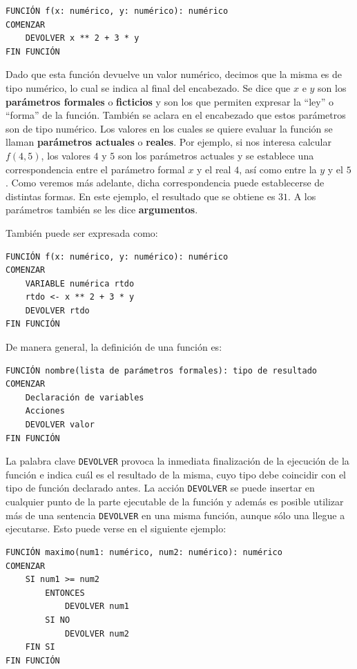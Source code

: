 \documentclass[]{book}
\begin{document}
\begin{verbatim}
FUNCIÓN f(x: numérico, y: numérico): numérico
COMENZAR
    DEVOLVER x ** 2 + 3 * y
FIN FUNCIÓN
\end{verbatim}

Dado que esta función devuelve un valor numérico, decimos que la misma es de tipo numérico, lo cual se indica al final del encabezado. Se dice que \(x\) e \(y\) son los \textbf{parámetros formales} o \textbf{ficticios} y son los que permiten expresar la ``ley'' o ``forma'' de la función. También se aclara en el encabezado que estos parámetros son de tipo numérico. Los valores en los cuales se quiere evaluar la función se llaman \textbf{parámetros actuales} o \textbf{reales}. Por ejemplo, si nos interesa calcular \(f(4, 5)\), los valores \(4\) y \(5\) son los parámetros actuales y se establece una correspondencia entre el parámetro formal \(x\) y el real \(4\), así como entre la \(y\) y el \(5\). Como veremos más adelante, dicha correspondencia puede establecerse de distintas formas. En este ejemplo, el resultado que se obtiene es \(31\). A los parámetros también se les dice \textbf{argumentos}.

También puede ser expresada como:

\begin{verbatim}
FUNCIÓN f(x: numérico, y: numérico): numérico
COMENZAR
    VARIABLE numérica rtdo
    rtdo <- x ** 2 + 3 * y
    DEVOLVER rtdo
FIN FUNCIÓN
\end{verbatim}

De manera general, la definición de una función es:

\begin{verbatim}
FUNCIÓN nombre(lista de parámetros formales): tipo de resultado
COMENZAR
    Declaración de variables
    Acciones
    DEVOLVER valor
FIN FUNCIÓN
\end{verbatim}

La palabra clave \texttt{DEVOLVER} provoca la inmediata finalización de la ejecución de la función e indica cuál es el resultado de la misma, cuyo tipo debe coincidir con el tipo de función declarado antes. La acción \texttt{DEVOLVER} se puede insertar en cualquier punto de la parte ejecutable de la función y además es posible utilizar más de una sentencia \texttt{DEVOLVER} en una misma función, aunque sólo una llegue a ejecutarse. Esto puede verse en el siguiente ejemplo:

\begin{verbatim}
FUNCIÓN maximo(num1: numérico, num2: numérico): numérico
COMENZAR
    SI num1 >= num2
        ENTONCES
            DEVOLVER num1
        SI NO
            DEVOLVER num2
    FIN SI
FIN FUNCIÓN
\end{verbatim}
\end{document}
